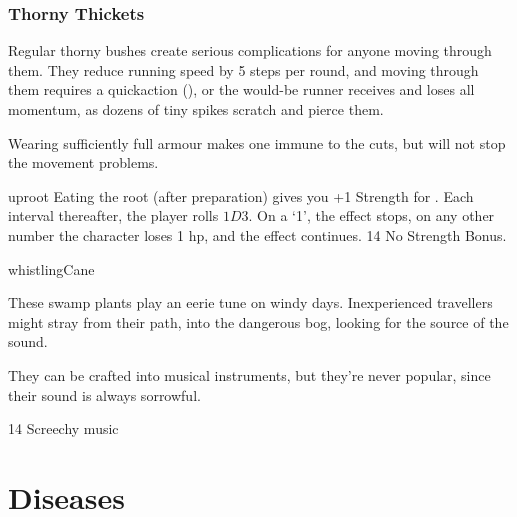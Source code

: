 \begin{multicols}{2}
\subsubsection{Thorny Thickets}
\label{thorny_thickets}

Regular thorny bushes create serious complications for anyone moving through them.
They reduce running speed by 5 \glspl{step} per round, and moving through them requires a  \gls{quickaction} (\tn[10]), or the would-be runner receives  and loses all momentum, as dozens of tiny spikes scratch and pierce them.

Wearing sufficiently full armour makes one immune to the cuts, but will not stop the movement problems.

%
  {uproot}%
  {
  Eating the root (after preparation) gives you +1 Strength for .
  Each \gls{interval} thereafter, the player rolls $1D3$.
  On a `1', the effect stops, on any other number the character loses 1 \gls{hp}, and the effect continues.
    }
{}%
{14}%
{No Strength Bonus.}%

%
  {whistlingCane}%
  {
  These swamp plants play an eerie tune on windy days.
  Inexperienced travellers might stray from their path, into the dangerous bog, looking for the source of the sound.

  They can be crafted into musical instruments, but they're never popular, since their sound is always sorrowful.
  }
{}%
{14}%
{Screechy music}%

\end{multicols}

\section{Diseases}
\label{diseases}

\newcommand\disease[5][\roll{Intelligence}{Medicine}]{
  \subsubsection{#2}
  \index{#2 (Disease)}
  \label{#2}
  #3
  \needspace{2em}
  \begin{description}
    \item[\flwr~\Glspl{ingredient}] #4
    \item[Roll] #1 (\tn[#5])
  \end{description}
}

